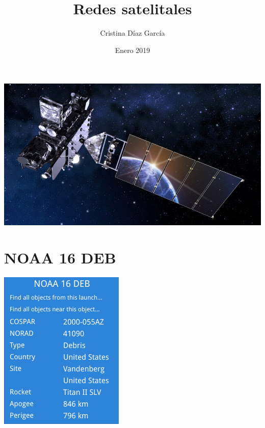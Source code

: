 \documentclass{article}
\title{Redes satelitales}
\author{Cristina Díaz García}
\date{Enero 2019}
\begin{document}

\begin{titlingpage}
\maketitle

\begin{center}
\includegraphics[scale=0.4]{satellite.jpg} 
\end{center}

\end{titlingpage}

\newpage

\tableofcontents

\newpage

\section{NOAA 16 DEB}

\begin{center}
\includegraphics[scale=0.6]{NOAA16DEB.png}
\end{center}
\end{document}

